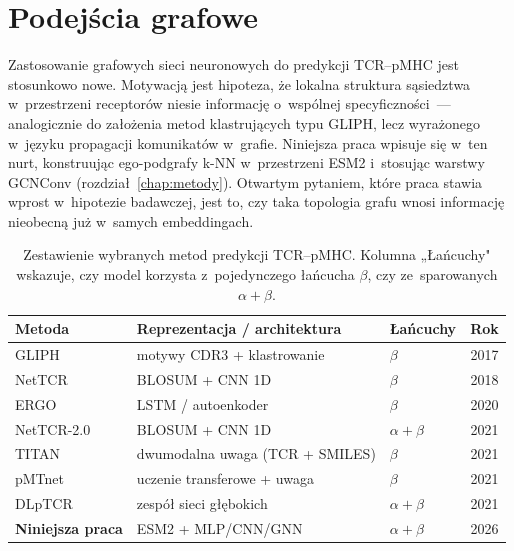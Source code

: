 \documentclass{SGGW-thesis}
\begin{document}
\section{Podejścia grafowe}

Zastosowanie grafowych sieci neuronowych do predykcji TCR--pMHC jest stosunkowo nowe. Motywacją jest
hipoteza, że lokalna struktura sąsiedztwa w~przestrzeni receptorów niesie informację o~wspólnej
specyficzności~--- analogicznie do założenia metod klastrujących typu GLIPH, lecz wyrażonego w~języku
propagacji komunikatów w~grafie. Niniejsza praca wpisuje się w~ten nurt, konstruując ego-podgrafy
k-NN w~przestrzeni ESM2 i~stosując warstwy GCNConv (rozdział~\ref{chap:metody}). Otwartym pytaniem,
które praca stawia wprost w~hipotezie badawczej, jest to, czy taka topologia grafu wnosi informację
nieobecną już w~samych embeddingach.

\begin{table}[htbp]
\centering
\small
\caption{Zestawienie wybranych metod predykcji TCR--pMHC. Kolumna „Łańcuchy" wskazuje, czy model
korzysta z~pojedynczego łańcucha $\beta$, czy ze~sparowanych $\alpha{+}\beta$.}
\label{tab:related_work}
\begin{tabular}{lllc}
\toprule
\textbf{Metoda} & \textbf{Reprezentacja / architektura} & \textbf{Łańcuchy} & \textbf{Rok} \\
\midrule
GLIPH~\cite{glanville2017}        & motywy CDR3 + klastrowanie        & $\beta$            & 2017 \\
NetTCR~\cite{jurtz2018}           & BLOSUM + CNN 1D                   & $\beta$            & 2018 \\
ERGO~\cite{springer2020}          & LSTM / autoenkoder                & $\beta$            & 2020 \\
NetTCR-2.0~\cite{montemurro2022}  & BLOSUM + CNN 1D                   & $\alpha{+}\beta$   & 2021 \\
TITAN~\cite{weber2021}            & dwumodalna uwaga (TCR + SMILES)   & $\beta$            & 2021 \\
pMTnet~\cite{lu2021}              & uczenie transferowe + uwaga       & $\beta$            & 2021 \\
DLpTCR~\cite{xu2021dlptcr}        & zespół sieci głębokich            & $\alpha{+}\beta$   & 2021 \\
\midrule
\textbf{Niniejsza praca}          & ESM2 + MLP/CNN/GNN                & $\alpha{+}\beta$   & 2026 \\
\bottomrule
\end{tabular}
\end{table}
\end{document}
